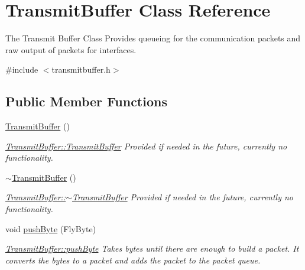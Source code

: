 \hypertarget{class_transmit_buffer}{}\section{Transmit\+Buffer Class Reference}
\label{class_transmit_buffer}


The Transmit Buffer Class Provides queueing for the communication packets and raw output of packets for interfaces.  




{\ttfamily \#include $<$transmitbuffer.\+h$>$}

\subsection*{Public Member Functions}
\begin{DoxyCompactItemize}
\item 
\hypertarget{class_transmit_buffer_adb5f67b087b5c8d1996f9f7b6fb42341}{}\label{class_transmit_buffer_adb5f67b087b5c8d1996f9f7b6fb42341} 
\hyperlink{class_transmit_buffer_adb5f67b087b5c8d1996f9f7b6fb42341}{Transmit\+Buffer} ()
\begin{DoxyCompactList}\small\item\em \hyperlink{class_transmit_buffer_adb5f67b087b5c8d1996f9f7b6fb42341}{Transmit\+Buffer\+::\+Transmit\+Buffer} Provided if needed in the future, currently no functionality. \end{DoxyCompactList}\item 
\hypertarget{class_transmit_buffer_a9de4adf2b6fef27e9f35ce3392fb12d2}{}\label{class_transmit_buffer_a9de4adf2b6fef27e9f35ce3392fb12d2} 
\hyperlink{class_transmit_buffer_a9de4adf2b6fef27e9f35ce3392fb12d2}{$\sim$\+Transmit\+Buffer} ()
\begin{DoxyCompactList}\small\item\em \hyperlink{class_transmit_buffer_a9de4adf2b6fef27e9f35ce3392fb12d2}{Transmit\+Buffer\+::$\sim$\+Transmit\+Buffer} Provided if needed in the future, currently no functionality. \end{DoxyCompactList}\item 
void \hyperlink{class_transmit_buffer_aa7966064a6abaeb5ff3f7c8ff0402ec3}{push\+Byte} (Fly\+Byte)
\begin{DoxyCompactList}\small\item\em \hyperlink{class_transmit_buffer_aa7966064a6abaeb5ff3f7c8ff0402ec3}{Transmit\+Buffer\+::push\+Byte} Takes bytes until there are enough to build a packet. It converts the bytes to a packet and adds the packet to the packet queue. \end{DoxyCompactList}\item 

\end{DoxyCompactItemize}
